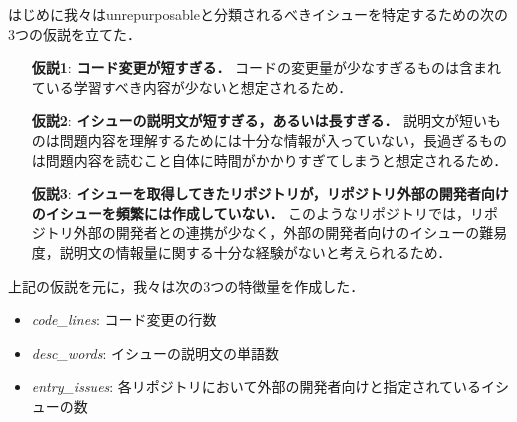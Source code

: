 はじめに我々はunrepurposableと分類されるべきイシューを特定するための次の3つの仮説を立てた．
\begin{itemize}
\item[\textbf{仮説1}: ] \textbf{コード変更が短すぎる．} コードの変更量が少なすぎるものは含まれている学習すべき内容が少ないと想定されるため．
\item[\textbf{仮説2}: ] \textbf{イシューの説明文が短すぎる，あるいは長すぎる．} 説明文が短いものは問題内容を理解するためには十分な情報が入っていない，長過ぎるものは問題内容を読むこと自体に時間がかかりすぎてしまうと想定されるため．
\item[\textbf{仮説3}: ] \textbf{イシューを取得してきたリポジトリが，リポジトリ外部の開発者向けのイシューを頻繁には作成していない．} このようなリポジトリでは，リポジトリ外部の開発者との連携が少なく，外部の開発者向けのイシューの難易度，説明文の情報量に関する十分な経験がないと考えられるため．
\end{itemize}


上記の仮説を元に，我々は次の3つの特徴量を作成した．


\begin{itemize}
  \item \textit{code\_lines}: コード変更の行数
  \item \textit{desc\_words}: イシューの説明文の単語数
  \item \textit{entry\_issues}: 各リポジトリにおいて外部の開発者向けと指定されているイシューの数
\end{itemize}


